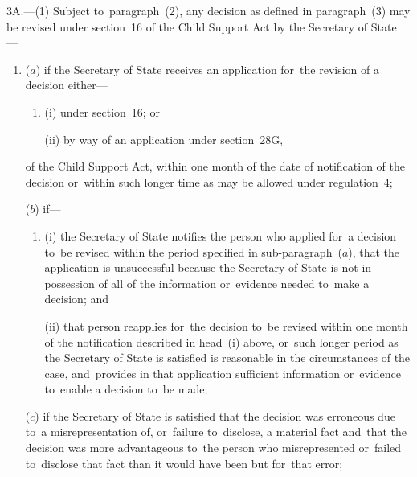 \documentclass[12pt,a4paper]{article}
\begin{document}
3A.---(1)  Subject to~paragraph~(2), any decision as defined in paragraph~(3) may be revised under section~16 of the Child Support Act by the 
Secretary of State%
—
\begin{enumerate}\item[]
($a$) if 
the Secretary of State  %
receives an application for~the revision of a decision either—
\begin{enumerate}\item[]
(i) under section~16; or

(ii) by way of an application under section~28G,
\end{enumerate}
of the Child Support Act, within one month of the date of notification of the decision or~within such longer time as may be allowed under regulation~4;

($b$) if—
\begin{enumerate}\item[]
(i) 
the Secretary of State  %
notifies the person who applied for~a decision to~be revised within the period specified in sub-paragraph~($a$), that the application is unsuccessful because the 
Secretary of State  %
is not in possession of all of the information or~evidence needed to~make a decision; and

(ii) that person reapplies for~the decision to~be revised within one month of the notification described in head~(i)  above, or~such longer period as the 
Secretary of State  %
is satisfied is reasonable in the circumstances of the case, and~provides in that application sufficient information or~evidence to~enable a decision to~be made;
\end{enumerate}

($c$) if 
the Secretary of State  %
is satisfied that the decision was erroneous due to~a misrepresentation of, or~failure to~disclose, a material fact and~that the decision was more advantageous to~the person who misrepresented or~failed to~disclose that fact than it would have been but for~that error;


\end{enumerate}
\end{document}
